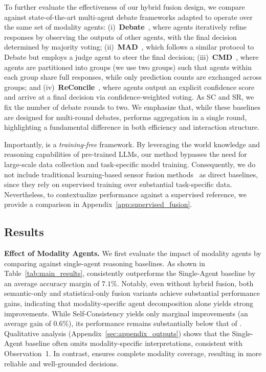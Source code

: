 

To further evaluate the effectiveness of our hybrid fusion design, we compare \system{} against state-of-the-art multi-agent debate frameworks adapted to operate over the same set of modality agents: (i)~\textbf{Debate}~\citep{debate}, where agents iteratively refine responses by observing the outputs of other agents, with the final decision determined by majority voting; (ii)~\textbf{MAD}~\citep{mad}, which follows a similar protocol to Debate but employs a judge agent to steer the final decision; (iii)~\textbf{CMD}~\citep{cmd}, where agents are partitioned into groups (we use two groups) such that agents within each group share full responses, while only prediction counts are exchanged across groups; and (iv)~\textbf{ReConcile}~\citep{reconcile}, where agents output an explicit confidence score and arrive at a final decision via confidence-weighted voting. As SC and SR, we fix the number of debate rounds to two. We emphasize that, while these baselines are designed for multi-round debates, \system{} performs aggregation in a single round, highlighting a fundamental difference in both efficiency and interaction structure.

Importantly, \system{} is a \textit{training-free} framework. By leveraging the world knowledge and reasoning capabilities of pre-trained LLMs, our method bypasses the need for large-scale data collection and task-specific model training. Consequently, we do not include traditional learning-based sensor fusion methods~\citep{multimodalsensing} as direct baselines, since they rely on supervised training over substantial task-specific data. Nevertheless, to contextualize performance against a supervised reference, we provide a comparison in Appendix~\ref{app:supervised_fusion}.

\subsection{Results}
\label{sec:exp_results}

\noindent \textbf{Effect of Modality Agents.} We first evaluate the impact of modality agents by comparing \system{} against single-agent reasoning baselines. As shown in Table~\ref{tab:main_results}, \system{} consistently outperforms the Single-Agent baseline by an average accuracy margin of $7.1\%$. Notably, even without hybrid fusion, both semantic-only and statistical-only fusion variants achieve substantial performance gains, indicating that modality-specific agent decomposition alone yields strong improvements. While Self-Consistency yields only marginal improvements (an average gain of $0.6\%$), its performance remains substantially below that of \system{}. Qualitative analysis (Appendix~\ref{sec:appendix_outputs}) shows that the Single-Agent baseline often omits modality-specific interpretations, consistent with Observation~1. In contrast, \system{} ensures complete modality coverage, resulting in more reliable and well-grounded decisions.

